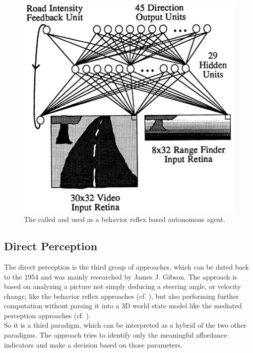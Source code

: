 \begin{figure}
	\centering
	\includegraphics[scale=0.4]{src/pic/ALVINN.png}
	\caption{The \nn called \alvinn and used as a behavior reflex based autonomous agent. \cite{pomerleau1989alvinn}}
	\label{pic: ALVINN}
\end{figure}

\subsection{Direct Perception}\label{subsec: Direct Perception}


The direct perception is the third group of approaches, which can be dated back to the 1954 and was mainly researched by James J. Gibson. \cite{gibson1954theory} The approach is based on analyzing a picture not simply deducing a steering angle, or velocity change, like the behavior reflex approaches (cf. ), but also performing further computation without parsing it into a 3D world state model like the mediated perception approaches (cf. ). \cite{chen2015deepdriving}\\
So it is a third paradigm, which can be interpreted as a hybrid of the two other paradigms. The approach tries to identify only the meaningful affordance indicators and make a decision based on those parameters. 

